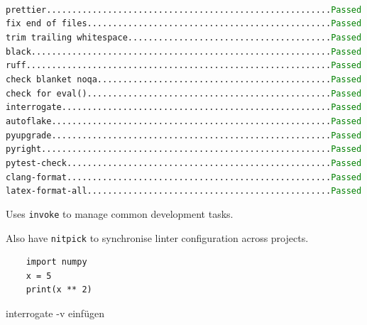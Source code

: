 \documentclass{prettytex/ox/mmsc-special-topic}
\begin{document}
  \texttt{
    \hspace*{-1em} prettier........................................................\textcolor{green}{Passed} \\
    fix end of files................................................\textcolor{green}{Passed} \\
    trim trailing whitespace........................................\textcolor{green}{Passed} \\
    black...........................................................\textcolor{green}{Passed} \\
    ruff............................................................\textcolor{green}{Passed} \\
    check blanket noqa..............................................\textcolor{green}{Passed} \\
    check for eval()................................................\textcolor{green}{Passed} \\
    interrogate.....................................................\textcolor{green}{Passed} \\
    autoflake.......................................................\textcolor{green}{Passed} \\
    pyupgrade.......................................................\textcolor{green}{Passed} \\
    pyright.........................................................\textcolor{green}{Passed} \\
    pytest-check....................................................\textcolor{green}{Passed} \\
    clang-format....................................................\textcolor{green}{Passed} \\
    latex-format-all................................................\textcolor{green}{Passed} \\
  }

  Uses \texttt{invoke} to manage common development tasks.

  Also have \texttt{nitpick} to synchronise linter configuration across projects.

  \begin{verbatim}
    import numpy
    x = 5
    print(x ** 2)
  \end{verbatim}

  interrogate -v einfügen
\end{document}
